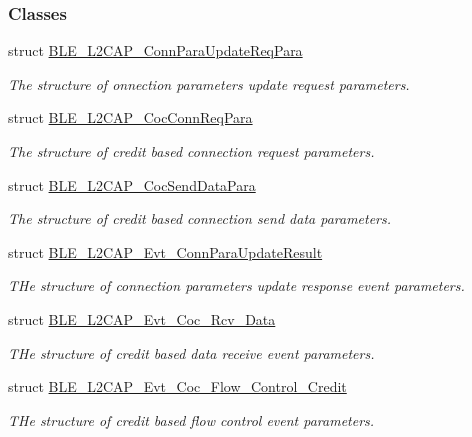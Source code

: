 \subsubsection*{Classes}
\begin{DoxyCompactItemize}
\item 
struct \hyperlink{struct_b_l_e___l2_c_a_p___conn_para_update_req_para}{B\+L\+E\+\_\+\+L2\+C\+A\+P\+\_\+\+Conn\+Para\+Update\+Req\+Para}
\begin{DoxyCompactList}\small\item\em The structure of onnection parameters update request parameters. \end{DoxyCompactList}\item 
struct \hyperlink{struct_b_l_e___l2_c_a_p___coc_conn_req_para}{B\+L\+E\+\_\+\+L2\+C\+A\+P\+\_\+\+Coc\+Conn\+Req\+Para}
\begin{DoxyCompactList}\small\item\em The structure of credit based connection request parameters. \end{DoxyCompactList}\item 
struct \hyperlink{struct_b_l_e___l2_c_a_p___coc_send_data_para}{B\+L\+E\+\_\+\+L2\+C\+A\+P\+\_\+\+Coc\+Send\+Data\+Para}
\begin{DoxyCompactList}\small\item\em The structure of credit based connection send data parameters. \end{DoxyCompactList}\item 
struct \hyperlink{struct_b_l_e___l2_c_a_p___evt___conn_para_update_result}{B\+L\+E\+\_\+\+L2\+C\+A\+P\+\_\+\+Evt\+\_\+\+Conn\+Para\+Update\+Result}
\begin{DoxyCompactList}\small\item\em T\+He structure of connection parameters update response event parameters. \end{DoxyCompactList}\item 
struct \hyperlink{struct_b_l_e___l2_c_a_p___evt___coc___rcv___data}{B\+L\+E\+\_\+\+L2\+C\+A\+P\+\_\+\+Evt\+\_\+\+Coc\+\_\+\+Rcv\+\_\+\+Data}
\begin{DoxyCompactList}\small\item\em T\+He structure of credit based data receive event parameters. \end{DoxyCompactList}\item 
struct \hyperlink{struct_b_l_e___l2_c_a_p___evt___coc___flow___control___credit}{B\+L\+E\+\_\+\+L2\+C\+A\+P\+\_\+\+Evt\+\_\+\+Coc\+\_\+\+Flow\+\_\+\+Control\+\_\+\+Credit}
\begin{DoxyCompactList}\small\item\em T\+He structure of credit based flow control event parameters. \end{DoxyCompactList}\item 

\end{DoxyCompactItemize}
